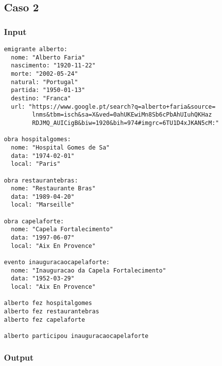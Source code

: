 \documentclass[a4paper]{article}
\begin{document}
\pagebreak
\subsection{Caso 2}
\label{sec:4.1}


\subsubsection{Input}

\lstset{language=tex}
\begin{lstlisting}
emigrante alberto:
  nome: "Alberto Faria"
  nascimento: "1920-11-22"
  morte: "2002-05-24"
  natural: "Portugal"
  partida: "1950-01-13"
  destino: "Franca"
  url: "https://www.google.pt/search?q=alberto+faria&source=
        lnms&tbm=isch&sa=X&ved=0ahUKEwiMn8Sb6cPbAhUIuhQKHaz
        RDJMQ_AUICigB&biw=1920&bih=974#imgrc=6TU1D4xJKAN5cM:"

obra hospitalgomes:
  nome: "Hospital Gomes de Sa"
  data: "1974-02-01"
  local: "Paris"

obra restaurantebras:
  nome: "Restaurante Bras"
  data: "1989-04-20"
  local: "Marseille"

obra capelaforte:
  nome: "Capela Fortalecimento"
  data: "1997-06-07"
  local: "Aix En Provence"

evento inauguracaocapelaforte:
  nome: "Inauguracao da Capela Fortalecimento"
  data: "1952-03-29"
  local: "Aix En Provence"

alberto fez hospitalgomes
alberto fez restaurantebras
alberto fez capelaforte

alberto participou inauguracaocapelaforte

\end{lstlisting}

\pagebreak
\subsubsection{Output}
\end{document}
